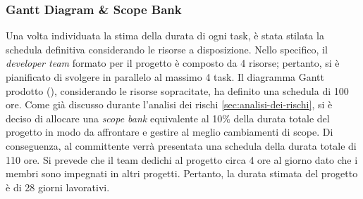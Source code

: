 \subsubsection{Gantt Diagram \& Scope Bank}
Una volta individuata la stima della durata di ogni task, è stata stilata la schedula definitiva considerando le risorse a disposizione.
Nello specifico, il \textit{developer team} formato per il progetto è composto da 4 risorse; pertanto, si è pianificato di svolgere in parallelo al massimo 4 task.
Il diagramma Gantt prodotto (), considerando le risorse sopracitate, ha definito una schedula di 100 ore.
Come già discusso durante l'analisi dei rischi \ref{sec:analisi-dei-rischi}, si è deciso di allocare una \textit{scope bank} equivalente al 10\% della durata totale del progetto in modo da affrontare e gestire al meglio cambiamenti di scope.
Di conseguenza, al committente verrà presentata una schedula della durata totale di 110 ore.
Si prevede che il team dedichi al progetto circa 4 ore al giorno dato che i membri sono impegnati in altri progetti.
Pertanto, la durata stimata del progetto è di 28 giorni lavorativi.
